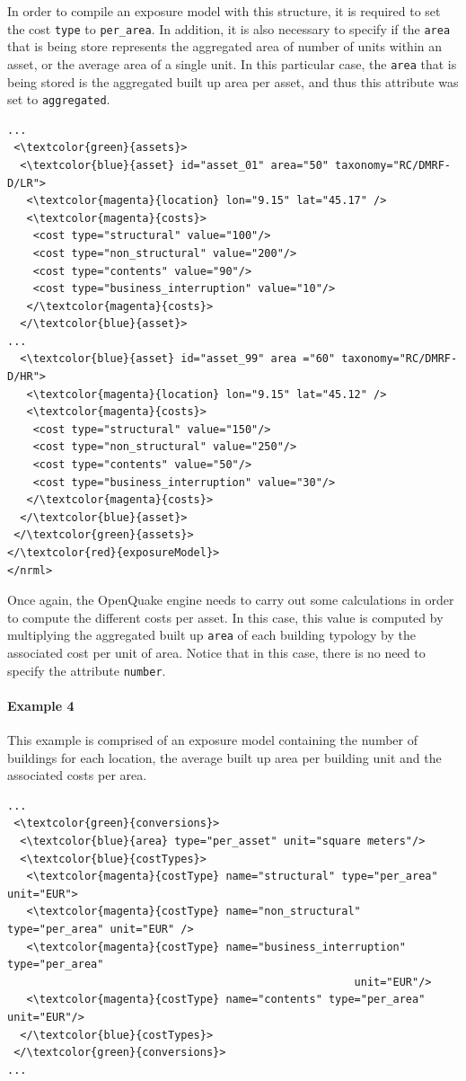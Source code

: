 In order to compile an \gls{exposure model} with this structure, it is required to set the cost \Verb+type+ to \Verb+per_area+. In addition, it is also necessary to specify if the \Verb+area+ that is being store represents the aggregated area of number of units within an asset, or the average area of a single unit. In this particular case, the \Verb+area+ that is being stored is the aggregated built up area per asset, and thus this attribute was set to \Verb+aggregated+.  

\begin{Verbatim}[frame=single, commandchars=\\\{\}, samepage=false]
...
 <\textcolor{green}{assets}>
  <\textcolor{blue}{asset} id="asset_01" area="50" taxonomy="RC/DMRF-D/LR">
   <\textcolor{magenta}{location} lon="9.15" lat="45.17" />
   <\textcolor{magenta}{costs}>
    <cost type="structural" value="100"/>
    <cost type="non_structural" value="200"/>
    <cost type="contents" value="90"/>
    <cost type="business_interruption" value="10"/>
   </\textcolor{magenta}{costs}>
  </\textcolor{blue}{asset}>
...
  <\textcolor{blue}{asset} id="asset_99" area ="60" taxonomy="RC/DMRF-D/HR">
   <\textcolor{magenta}{location} lon="9.15" lat="45.12" />
   <\textcolor{magenta}{costs}>
    <cost type="structural" value="150"/>
    <cost type="non_structural" value="250"/>
    <cost type="contents" value="50"/>
    <cost type="business_interruption" value="30"/>
   </\textcolor{magenta}{costs}>
  </\textcolor{blue}{asset}>
 </\textcolor{green}{assets}>
</\textcolor{red}{exposureModel}>
</nrml>
\end{Verbatim}

Once again, the OpenQuake engine needs to carry out some calculations in order to compute the different costs per asset. In this case, this value is computed by multiplying the aggregated built up \Verb+area+ of each building typology by the associated cost per unit of area. Notice that in this case, there is no need to specify the attribute \Verb+number+.

\paragraph{Example 4}
This example is comprised of an \gls{exposure model} containing the number of buildings for each location, the average built up area per building unit and the associated costs per area. 

\begin{Verbatim}[frame=single, commandchars=\\\{\}, samepage=false]
...
 <\textcolor{green}{conversions}>
  <\textcolor{blue}{area} type="per_asset" unit="square meters"/>
  <\textcolor{blue}{costTypes}>
   <\textcolor{magenta}{costType} name="structural" type="per_area" unit="EUR">
   <\textcolor{magenta}{costType} name="non_structural" type="per_area" unit="EUR" />
   <\textcolor{magenta}{costType} name="business_interruption" type="per_area" 
                                                      unit="EUR"/>
   <\textcolor{magenta}{costType} name="contents" type="per_area" unit="EUR"/>
  </\textcolor{blue}{costTypes}>
 </\textcolor{green}{conversions}>
...
\end{Verbatim}

